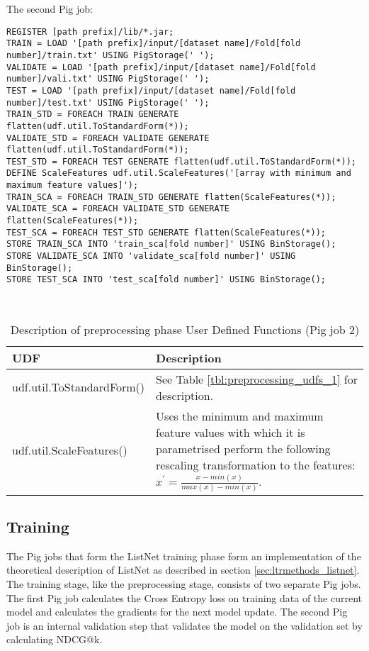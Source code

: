The second Pig job:\\
\begin{minipage}{\linewidth}
\begin{lstlisting}
REGISTER [path prefix]/lib/*.jar;
TRAIN = LOAD '[path prefix]/input/[dataset name]/Fold[fold number]/train.txt' USING PigStorage(' ');
VALIDATE = LOAD '[path prefix]/input/[dataset name]/Fold[fold number]/vali.txt' USING PigStorage(' ');
TEST = LOAD '[path prefix]/input/[dataset name]/Fold[fold number]/test.txt' USING PigStorage(' ');
TRAIN_STD = FOREACH TRAIN GENERATE flatten(udf.util.ToStandardForm(*));
VALIDATE_STD = FOREACH VALIDATE GENERATE flatten(udf.util.ToStandardForm(*));
TEST_STD = FOREACH TEST GENERATE flatten(udf.util.ToStandardForm(*));
DEFINE ScaleFeatures udf.util.ScaleFeatures('[array with minimum and maximum feature values]');
TRAIN_SCA = FOREACH TRAIN_STD GENERATE flatten(ScaleFeatures(*));
VALIDATE_SCA = FOREACH VALIDATE_STD GENERATE flatten(ScaleFeatures(*));
TEST_SCA = FOREACH TEST_STD GENERATE flatten(ScaleFeatures(*));
STORE TRAIN_SCA INTO 'train_sca[fold number]' USING BinStorage();
STORE VALIDATE_SCA INTO 'validate_sca[fold number]' USING BinStorage();
STORE TEST_SCA INTO 'test_sca[fold number]' USING BinStorage();
\end{lstlisting}
\end{minipage}\\

\begin{table}
\centering
\begin{tabular}{p{5cm}p{8cm}}\toprule
UDF & Description \\
\midrule
udf.util.ToStandardForm() & See Table \ref{tbl:preprocessing_udfs_1} for description.\\
udf.util.ScaleFeatures() & Uses the minimum and maximum feature values with which it is parametrised perform the following rescaling transformation to the features: $x^{'} = \frac{x-min(x)}{max(x)-min(x)}$.\\
\bottomrule
\end{tabular}
\caption{Description of preprocessing phase User Defined Functions (Pig job 2)}
\label{tbl:preprocessing_udfs_2}
\end{table}

\subsection{Training}
The Pig jobs that form the ListNet training phase form an implementation of the theoretical description of ListNet as described in section \ref{sec:ltrmethods_listnet}. The training stage, like the preprocessing stage, consists of two separate Pig jobs. The first Pig job calculates the Cross Entropy loss on training data of the current model and calculates the gradients for the next model update. The second Pig job is an internal validation step that validates the model on the validation set by calculating \ac{NDCG}@k.\\

